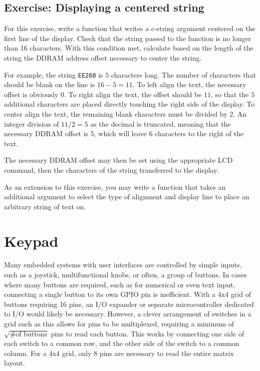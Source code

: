 \documentclass[
  9pt,
  letterpaper,
  abstract,
  titlepage]{scrbook}
\begin{document}
\subsection{Exercise: Displaying a centered
string}\label{exercise-displaying-a-centered-string}

For this exercise, write a function that writes a c-string argument
centered on the first line of the display. Check that the string passed
to the function is no longer than 16 characters. With this condition
met, calculate based on the length of the string the DDRAM address
offset necessary to center the string.

For example, the string \texttt{EE260} is \(5\) characters long. The
number of characters that should be blank on the line is \(16-5=11\). To
left align the text, the necessary offset is obviously \(0\). To right
align the text, the offset should be \(11\), so that the \(5\)
additional characters are placed directly touching the right side of the
display. To center align the text, the remaining blank characters must
be divided by 2. An integer division of \(11/2=5\) as the decimal is
truncated, meaning that the necessary DDRAM offset is \(5\), which will
leave \(6\) characters to the right of the text.

The necessary DDRAM offset may then be set using the appropriate LCD
command, then the characters of the string transferred to the display.

As an extension to this exercise, you may write a function that takes an
additional argument to select the type of alignment and display line to
place an arbitrary string of text on.

\section{Keypad}\label{keypad}

Many embedded systems with user interfaces are controlled by simple
inputs, such as a joystick, multifunctional knobs, or often, a group of
buttons. In cases where many buttons are required, such as for numerical
or even text input, connecting a single button to its own GPIO pin is
inefficient. With a 4x4 grid of buttons requiring 16 pins, an I/O
expander or separate microcontroller dedicated to I/O would likely be
necessary. However, a clever arrangement of switches in a grid such as
this allows for pins to be multiplexed, requiring a minimum of
\(\sqrt{\text{\# of buttons}}\) pins to read each button. This works by
connecting one side of each switch to a common row, and the other side
of the switch to a common column. For a 4x4 grid, only 8 pins are
necessary to read the entire matrix layout.
\end{document}
